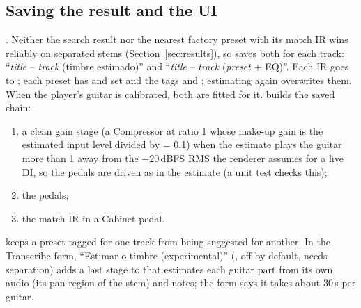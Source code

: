 \subsection{Saving the result and the UI}
\label{sec:impl-save}

\done. Neither the search result nor the nearest factory preset with its match
IR wins reliably on separated stems (Section~\ref{sec:results}), so
 saves both for each track: ``\emph{title} -- \emph{track}
(timbre estimado)'' and ``\emph{title} -- \emph{track} (\emph{preset} + EQ)''.
Each IR goes to ; each preset has
 and  set and the tags  and
; estimating again overwrites them.
When the player's guitar is calibrated, both are fitted for it.
 builds the saved chain:
\begin{enumerate}
\item a clean gain stage (a Compressor at ratio 1 whose make-up gain is the
  estimated input level divided by  = 0.1) when the
  estimate plays the guitar more than 1\dB{} away from the $-20$\,dBFS RMS
  the renderer assumes for a live DI, so the pedals are driven as in the
  estimate (a unit test checks this);
\item the pedals;
\item the match IR in a Cabinet pedal.
\end{enumerate}
 keeps a preset tagged for one track
from being suggested for another. In the Transcribe form, ``Estimar o timbre
(experimental)'' (, off by default, needs
separation) adds a last stage to  that estimates each
guitar part from its own audio (its pan region of the stem) and notes; the form
says it takes about 30\,s per guitar.

